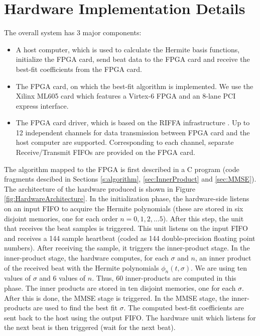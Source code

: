 \documentclass[runningheads]{llncs}
\begin{document}
\section{Hardware Implementation Details}\label{s:implementation}

The overall system has 3 major components:
\begin{itemize}
\item A host computer, which is used to calculate the Hermite basis functions,
initialize the FPGA card, send beat data to the FPGA card and receive
the best-fit coefficients from the FPGA card.
\item The FPGA card, on which the best-fit algorithm is implemented.   We use the
Xilinx ML605 card which features a Virtex-6 FPGA and an 8-lane PCI express interface.
\item The FPGA card driver, which is based on the RIFFA infrastructure \cite{c:jacobsen13}. 
Up to 12 independent channels for data transmission between FPGA card and the host
computer are supported. Corresponding to each channel, separate Receive/Transmit FIFOs
are provided on the FPGA card. 
\end{itemize}

The algorithm mapped to the FPGA 
is first described in a C program (code fragments descibed in Sections \ref{s:algorithm},  \ref{sec:InnerProduct} and \ref{sec:MMSE}).
The architecture of the hardware produced is shown in Figure \ref{fig:HardwareArchitecture}.
In the initialization phase, the hardware-side listens on an input FIFO to acquire
the Hermite polynomials (these are stored in six disjoint memories, one
for each order $n=0,1,2,\ldots 5$).  After this step, the unit that receives
the beat samples is triggered.  This unit listens on the input FIFO and receives a 144 sample
heartbeat (coded as 144 double-precision floating point numbers).  After receiving
the sample, it triggers the inner-product stage.  In the inner-product stage, the hardware computes, for each $\sigma$ and
$n$, an inner product of the received beat with the Hermite polynomials $\phi_n(t,\sigma)$.
We are using ten values of $\sigma$ and $6$ values of $n$.  Thus, 60 inner-products
are computed in this phase.  The inner products are stored in ten
disjoint memories, one for each $\sigma$.  After this is done, the MMSE
stage is triggered.  In the MMSE stage, the inner-products are used to find the best fit $\sigma$.
The computed best-fit coefficients are sent back to the host using the output FIFO.
The hardware unit which listens for the next beat is then triggered (wait for the next beat).
\end{document}
